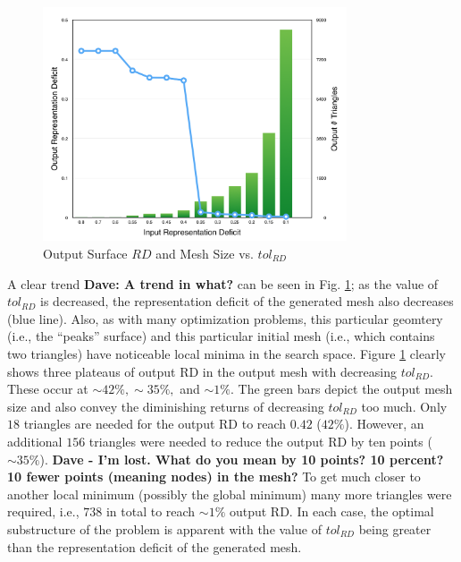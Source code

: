 \begin{figure}[h!]
  \begin{center}
  \includegraphics[width=90mm]{Figures/RDvsMeshSize.png}
  \caption{Output Surface $RD$ and Mesh Size vs. $tol_{RD}$}
  \label{fig_RDvsMeshSize}
  \end{center}
\end{figure}

A clear trend {\bf{Dave: A trend in what?}} can be seen in 
Fig. \ref{fig_RDvsMeshSize}; as the value of
$tol_{RD}$ is decreased, the representation deficit of the generated mesh
also decreases (blue line). Also, as with many optimization problems,
this particular geomtery (i.e., the ``peaks'' surface) and this particular 
initial mesh (i.e., which contains two triangles) have noticeable local 
minima in the search space.
Figure \ref{fig_RDvsMeshSize} clearly shows three plateaus of output
RD in the output mesh with decreasing $tol_{RD}$. These occur at
$\sim42\%, \sim35\%,$ and $\sim1\%$. The green bars depict the output
mesh size and also convey the diminishing returns of decreasing
$tol_{RD}$ too much. Only $18$ triangles are needed for the output RD to
reach $0.42$ ($42\%$). However, an additional $156$ triangles were
needed to reduce the output RD by ten points ($\sim 35\%$). {\bf{Dave - 
I'm lost. What do you mean by 10 points?  10 percent?  10 fewer points 
(meaning nodes) in the mesh?}}  To get much closer to another local 
minimum (possibly the global minimum) many
more triangles were required, i.e., $738$ in total to reach $\sim 1\%$ 
output RD. In each case, the optimal substructure of the problem is 
apparent with the value of $tol_{RD}$ being greater than the 
representation deficit of the generated mesh.

